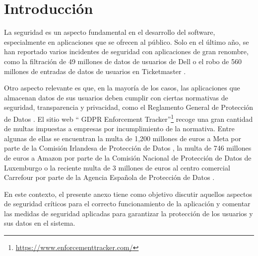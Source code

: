 \chapter{Introducción}
\label{anexo4:cap:introduccion}
La seguridad es un aspecto fundamental en el desarrollo del software,
especialmente en aplicaciones que se ofrecen al público. Solo en el último
año, se han reportado varios incidentes de seguridad con aplicaciones de gran
renombre, como la filtración de 49 millones de datos de usuarios de Dell
\parencites{DailyDarkWeb2024Apr}{Franceschi-Bicchierai2024May} o el robo de 560
millones de entradas de datos de usuarios en Ticketmaster
\parencite{Lawler2024Jun}.

Otro aspecto relevante es que, en la mayoría de los casos, las aplicaciones que
almacenan datos de sus usuarios deben cumplir con ciertas normativas de
seguridad, transparencia y privacidad, como el Reglamento General de Protección
de Datos \parencite{EuropeanParliament2016a}. El sitio web \enquote{ GDPR
Enforcement Tracker}\footnote{\url{https://www.enforcementtracker.com/}} recoge
una gran cantidad de multas impuestas a empresas por incumplimiento de la
normativa. Entre algunas de ellas se encuentran la multa de 1,200 millones de
euros a Meta por parte de la Comisión Irlandesa de Protección de Datos
\parencite{DataProtectionCommission2025Jun}, la multa de 746 millones de euros a
Amazon por parte de la Comisión Nacional de Protección de Datos de Luxemburgo o
la reciente multa de 3 millones de euros al centro comercial Carrefour por parte
de la Agencia Española de Protección de Datos
\parencite{AEPD:2025:PS00123:misc}.

En este contexto, el presente anexo tiene como objetivo discutir aquellos
aspectos de seguridad críticos para el correcto funcionamiento de la aplicación
y comentar las medidas de seguridad aplicadas para garantizar la protección de
los usuarios y sus datos en el sistema.
